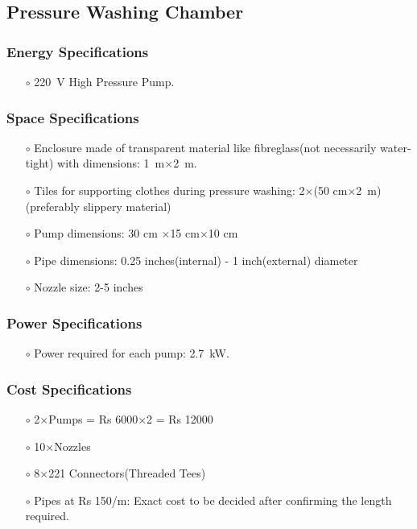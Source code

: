 \documentclass[12pt]{article}
\begin{document}
\subsection{Pressure Washing Chamber}
\subsubsection{Energy Specifications}
\begin{itemize}
    \item[$\scriptstyle\circ$] \SI{220}{\volt} High Pressure Pump.
\end{itemize}
\subsubsection{Space Specifications}
\begin{itemize}
    \item[$\scriptstyle\circ$] Enclosure made of transparent material like fibreglass(not necessarily water-tight) with dimensions: \SI{1}{\meter}$\times$\SI{2}{\meter}.
\item[$\scriptstyle\circ$] Tiles for supporting clothes during pressure washing: 2$\times$(50 \unit{\centi\metre}$\times$\SI{2}{\meter}) (preferably slippery material)
    \item[$\scriptstyle\circ$] Pump dimensions: 30 \unit{\centi\metre} $\times$15 \unit{\centi\metre}$\times$10 \unit{\centi\metre}
    \item[$\scriptstyle\circ$] Pipe dimensions: 0.25 inches(internal) - 1 inch(external) diameter
    \item[$\scriptstyle\circ$] Nozzle size: 2-5 inches
\end{itemize}
\subsubsection{Power Specifications}
\begin{itemize}
    \item[$\scriptstyle\circ$] Power required for each pump: \SI{2.7}{\kilo\watt}.
\end{itemize}

\subsubsection{Cost Specifications}
\begin{itemize}
    \item[$\scriptstyle\circ$] 2$\times$Pumps = Rs 6000$\times$2 = Rs 12000
    \item[$\scriptstyle\circ$] 10$\times$Nozzles
    \item[$\scriptstyle\circ$] 8$\times$221 Connectors(Threaded Tees)
    \item[$\scriptstyle\circ$] Pipes at Rs 150/m: Exact cost to be decided after confirming the length required.
\end{itemize}
\end{document}
